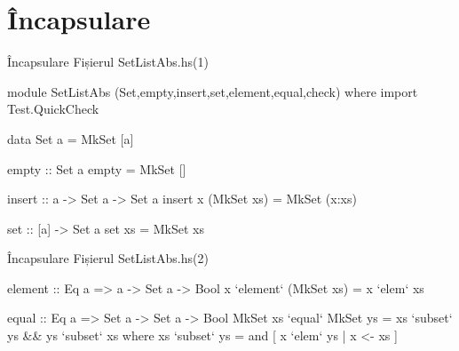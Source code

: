 \documentclass[handout,xcolor=pdftex,romanian,colorlinks]{beamer}
\begin{document}
%
%
%
%
%
%
%
%
%
%
%
%
%
%
%
%
%
%
%
%
%
%
%
%
%
%
%
%
%
%
%
%
%
%
%
%
%
\section{Încapsulare}

\begin{frame}[fragile]{Încapsulare}
{Fișierul SetListAbs.hs\hfill (1)}
\begin{asciihs}
module SetListAbs
(Set,empty,insert,set,element,equal,check) where
import Test.QuickCheck

data Set a   =  MkSet [a]

empty :: Set a
empty = MkSet []

insert :: a -> Set a -> Set a
insert x (MkSet xs) = MkSet (x:xs)

set :: [a] -> Set a
set xs = MkSet xs
\end{asciihs}
\end{frame}


\begin{frame}[fragile]{Încapsulare}
{Fișierul SetListAbs.hs\hfill (2)}
\begin{asciihs}
element :: Eq a => a -> Set a -> Bool
x `element` (MkSet xs) = x `elem` xs

equal :: Eq a => Set a -> Set a -> Bool
MkSet xs `equal` MkSet ys =
    xs `subset` ys && ys `subset` xs
  where
    xs `subset` ys = and [ x `elem` ys | x <- xs ]
\end{asciihs}
\end{frame}
\end{document}

